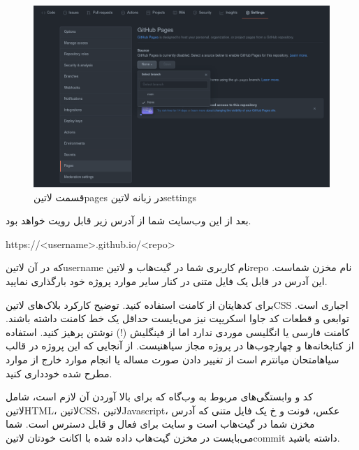 \documentclass[../main.tex]{subfiles}
\begin{document}
\begin{figure}[h]
  \centering
  \includegraphics[scale=0.3]{./github-step-2}
  \caption{قسمت ‌لاتین{pages} در زبانه ‌لاتین{settings}}
\end{figure}

بعد از این وب‌سایت شما از آدرس زیر قابل رویت خواهد بود.

\begin{latin}\begin{center}
https://<username>.github.io/<repo>
\end{center}\end{latin}

که در آن ‌لاتین{username} نام کاربری شما در گیت‌هاب و ‌لاتین{repo} نام مخزن شماست. این آدرس در قابل یک فایل متنی در کنار سایر موارد پروژه خود بارگذاری نمایید.


 برای کدهایتان از کامنت استفاده کنید. توضیح کارکرد بلاک‌های ‌لاتین{CSS} اجباری است. توابعی و قطعات کد جاوا اسکریپت نیز می‌بایست حداقل یک خط کامنت داشته باشند.
 کامنت فارسی یا انگلیسی موردی ندارد اما از فینگلیش (!) نوشتن پرهیز کنید.
 استفاده از کتابخانه‌ها و چهارچوب‌ها در پروژه مجاز ‌سیاه{نیست}.
 از آنجایی که این پروژه در قالب ‌سیاه{امتحان میانترم} است از تغییر دادن صورت مساله یا انجام موارد خارج از موارد مطرح شده خودداری کنید.


 کد و وابستگی‌های مربوط به وب‌گاه که برای بالا آوردن آن لازم است، شامل ‌لاتین{HTML}، ‌لاتین{CSS}، ‌لاتین{Javascript}، عکس، فونت و ‌خ
 یک فایل متنی که آدرس مخزن شما در گیت‌هاب است و سایت برای فعال و قابل دسترس است.
 شما می‌بایست در مخزن گیت‌هاب داده شده با اکانت خودتان ‌لاتین{commit} داشته باشید.
\end{document}
